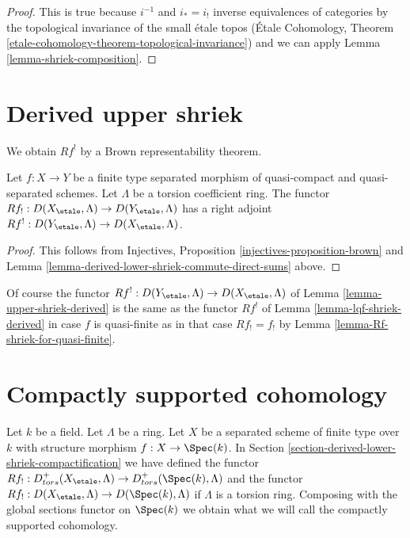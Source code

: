 \begin{proof}
This is true because $i^{-1}$ and $i_* = i_!$ inverse equivalences
of categories by the topological invariance of the small \'etale topos
(\'Etale Cohomology, Theorem
\ref{etale-cohomology-theorem-topological-invariance})
and we can apply
Lemma \ref{lemma-shriek-composition}.
\end{proof}









\section{Derived upper shriek}
\label{section-derived-upper-shriek}

\noindent
We obtain $Rf^!$ by a Brown representability theorem.

\begin{lemma}
\label{lemma-upper-shriek-derived}
Let $f : X \to Y$ be a finite type separated morphism of quasi-compact
and quasi-separated schemes. Let $\Lambda$ be a torsion coefficient ring.
The functor
$Rf_! : D(X_\etale, \Lambda) \to D(Y_\etale, \Lambda)$
has a right adjoint
$Rf^! : D(Y_\etale, \Lambda) \to D(X_\etale, \Lambda)$.
\end{lemma}

\begin{proof}
This follows from
Injectives, Proposition \ref{injectives-proposition-brown}
and Lemma \ref{lemma-derived-lower-shriek-commute-direct-sums} above.
\end{proof}

\noindent
Of course the functor $Rf^! : D(Y_\etale, \Lambda) \to D(X_\etale, \Lambda)$
of Lemma \ref{lemma-upper-shriek-derived} is the same as the functor
$Rf^!$ of Lemma \ref{lemma-lqf-shriek-derived} in case $f$ is
quasi-finite as in that case $Rf_! = f_!$ by
Lemma \ref{lemma-Rf-shriek-for-quasi-finite}.




\section{Compactly supported cohomology}
\label{section-compactly-supported-cohomology}

\noindent
Let $k$ be a field. Let $\Lambda$ be a ring. Let $X$ be a separated scheme
of finite type over $k$ with structure morphism $f : X \to \Spec(k)$.
In Section \ref{section-derived-lower-shriek-compactification}
we have defined the functor
$Rf_! : D^+_{tors}(X_\etale, \Lambda) \to D^+_{tors}(\Spec(k), \Lambda)$
and the functor $Rf_! : D(X_\etale, \Lambda) \to D(\Spec(k), \Lambda)$
if $\Lambda$ is a torsion ring. Composing with the global sections functor
on $\Spec(k)$ we obtain what we will call the compactly supported cohomology.

